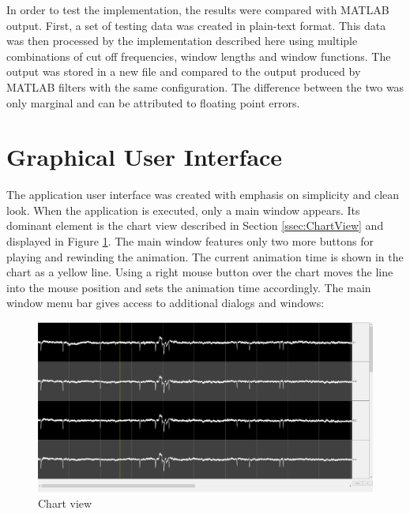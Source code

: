 In order to test the implementation, the results were compared with MATLAB output. First, a set of testing data was created in plain-text format. This data was then processed by the implementation described here using multiple combinations of cut off frequencies, window lengths and window functions. The output was stored in a new file and compared to the output produced by MATLAB filters with the same configuration. The difference between the two was only marginal and can be attributed to floating point errors.

\section{Graphical User Interface}
\label{sec:GUI}
The application user interface was created with emphasis on simplicity and clean look. When the application is executed, only a main window appears. Its dominant element is the chart view described in Section \ref{ssec:ChartView} and displayed in Figure \ref{fig:chartView}. The main window features only two more buttons for playing and rewinding the animation. The current animation time is shown in the chart as a yellow line. Using a right mouse button over the chart moves the line into the mouse position and sets the animation time accordingly. The main window menu bar gives access to additional dialogs and windows:

\begin{figure}[htb]
	\centering
	\includegraphics[width=1\linewidth]{fig/chartView.png}
	\caption{Chart view}
	\label{fig:chartView}
\end{figure}

